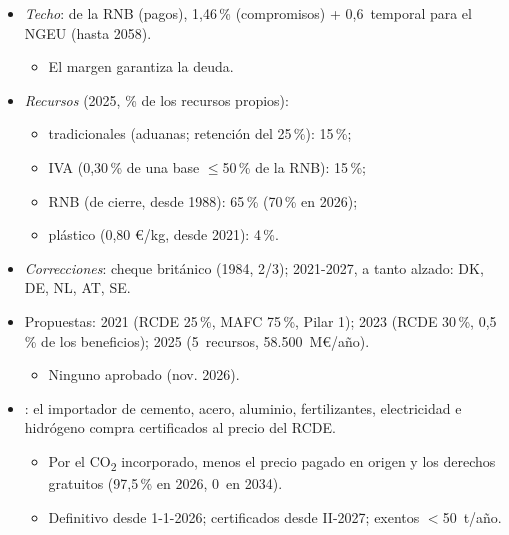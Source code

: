 \documentclass{article}
\begin{document}
\begin{columnas}
\begin{itemize}
\item \emph{Techo}:  de la RNB (pagos), 1,46\,\% (compromisos) + 0,6~temporal para el NGEU (hasta 2058).
  \begin{itemize}
  \item El margen garantiza la deuda.
  \end{itemize}
\item \emph{Recursos} (2025, \% de los recursos propios):
  \begin{itemize}
  \item tradicionales (aduanas; retención del 25\,\%): 15\,\%;
  \item IVA (0,30\,\% de una base $\leq$50\,\% de la RNB): 15\,\%;
  \item RNB (de cierre, desde 1988): 65\,\% (70\,\% en 2026);
  \item plástico (0,80 €/kg, desde 2021): 4\,\%.
  \end{itemize}
\item \emph{Correcciones}: cheque británico (1984, 2/3); 2021-2027, a tanto alzado: DK, DE, NL, AT, SE.
\end{itemize}
\begin{itemize}
\item Propuestas: 2021 (RCDE 25\,\%, MAFC 75\,\%, Pilar 1); 2023 (RCDE 30\,\%, 0,5\,\% de los beneficios); 2025 (5~recursos, 58.500~M€/año).
  \begin{itemize}
  \item Ninguno aprobado (nov. 2026).
  \end{itemize}
\item {} : el importador de cemento, acero, aluminio, fertilizantes, electricidad e hidrógeno compra certificados al precio del RCDE.
  \begin{itemize}
  \item Por el CO\textsubscript{2} incorporado, menos el precio pagado en origen y los derechos gratuitos (97,5\,\% en 2026, 0~en 2034).
  \item Definitivo desde 1-1-2026; certificados desde II-2027; exentos $<$50~t/año.
  \end{itemize}
\end{itemize}


\end{columnas}
\end{document}
